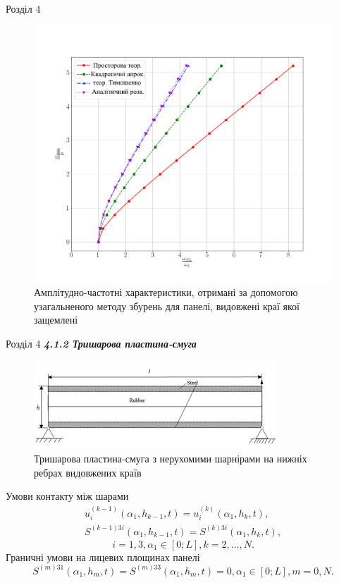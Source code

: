 \documentclass[8pt]{beamer}
\numberwithin{figure}{section}
\numberwithin{equation}{section}
\numberwithin{table}{section}
\begin{document}
\begin{frame}{Розділ 4}

\begin{figure}
	\includegraphics[scale=0.2]{pic/AFRC1ukr.png}
		\caption{Амплітудно-частотні характеристики, отримані за допомогою узагальненого методу збурень для панелі, видовжені краї якої защемлені}
		\label{fig:AFR_C}
\end{figure}


\end{frame}

\begin{frame}{Розділ 4}
\textbf{\textit{4.1.2 Тришарова пластина-смуга}}

\begin{figure}
	\includegraphics[scale=0.5]{pic/plate3layers.png}
		\caption{Тришарова пластина-смуга з нерухомими шарнірами на нижніх ребрах видовжених країв}
\end{figure}

Умови контакту між шарами
\begin{gather}
u_i^{(k-1)}\left(\alpha_1, h_{k-1},t \right)=u_i^{(k)}\left(\alpha_1, h_{k},t \right),\\
S^{(k-1)3i}\left(\alpha_1, h_{k-1},t \right)=S^{(k)3i}\left(\alpha_1, h_{k},t \right),
\end{gather}
\[ i=1,3, \alpha_1 \in [0;L], k=2,\dots,N.\]
Граничні умови на лицевих площинах панелі
\begin{equation}
S^{(m)31}\left(\alpha_1, h_{m},t \right)=S^{(m)33}\left(\alpha_1, h_{m},t \right)=0,\alpha_1 \in [0;L], m=0,N.
\end{equation}

\end{frame}
\end{document}

